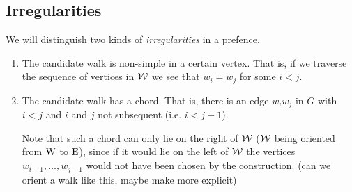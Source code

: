 \subsection{Irregularities}
We will distinguish two kinds of \emph{irregularities} in a prefence.
\begin{enumerate}
\item The candidate walk is non-simple in a certain vertex. That is, if we traverse the sequence of vertices in $\mathcal{W}$ we see that $w_i = w_j$ for some $i<j$.
\item The candidate walk has a chord. That is, there is an edge $w_i w_j$ in $G$ with $i<j$ and $i$ and $j$ not subsequent (i.e. $i < j-1$).

Note that such a chord can only lie on the right of $\mathcal{W}$ ($\mathcal{W}$ being oriented from $\mathrm{W}$ to $\mathrm{E}$), since if it would lie on the left of $\mathcal{W}$ the vertices $w_{i+1},\ldots, w_{j-1}$ would not have been chosen by the construction. \fxnote(can we orient a walk like this, maybe make more explicit)
\end{enumerate}

